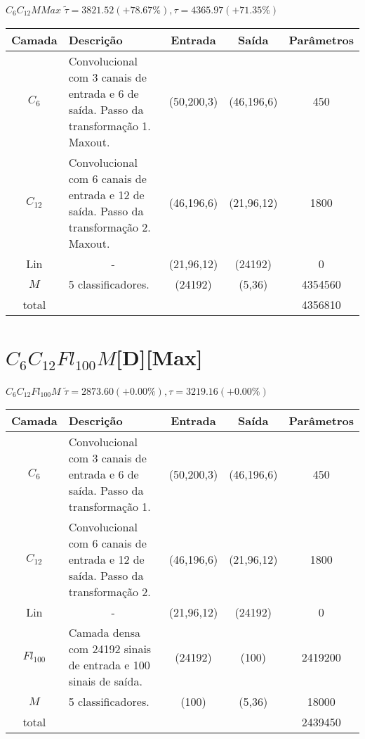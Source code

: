\begin{tiny}
\begin{table}[H]
	$C_6C_{12}MMax$ $\tilde{\tau}=3821.52 (+78.67\%), \tau=4365.97 (+71.35\%)$\newline
	\begin{tabularx}{\linewidth}{ |c|X|c|c|c| }
		\hline
		Camada & Descrição & Entrada & Saída & Parâmetros \\ \hline
		$C_{6}$ & Convolucional com 3 canais de entrada e 6 de saída. Passo da transformação 1. Maxout. & (50,200,3) & (46,196,6) & 450 \\ \hline
		$C_{12}$ & Convolucional com 6 canais de entrada e 12 de saída. Passo da transformação 2. Maxout. & (46,196,6) & (21,96,12) & 1800 \\ \hline
		Lin & \multicolumn{1}{c|}{-} & (21,96,12) & (24192) & 0 \\ \hline
		$M$ & 5 classificadores. & (24192) & (5,36) & 4354560 \\ \hline
		total &  &  &  & 4356810 \\ \hline
	\end{tabularx}
\end{table}

\section*{$C_6C_{12}Fl_{100}M$[D][Max]}

\begin{table}[H]
	$C_6C_{12}Fl_{100}M$ $\tilde{\tau}=2873.60 (+0.00\%), \tau=3219.16 (+0.00\%)$\newline
	\begin{tabularx}{\linewidth}{ |c|X|c|c|c| }
		\hline
		Camada & Descrição & Entrada & Saída & Parâmetros \\ \hline
		$C_{6}$ & Convolucional com 3 canais de entrada e 6 de saída. Passo da transformação 1. & (50,200,3) & (46,196,6) & 450 \\ \hline
		$C_{12}$ & Convolucional com 6 canais de entrada e 12 de saída. Passo da transformação 2. & (46,196,6) & (21,96,12) & 1800 \\ \hline
		Lin & \multicolumn{1}{c|}{-} & (21,96,12) & (24192) & 0 \\ \hline
		$Fl_{100}$ & Camada densa com 24192 sinais de entrada e 100 sinais de saída. & (24192) & (100) & 2419200 \\ \hline
		$M$ & 5 classificadores. & (100) & (5,36) & 18000 \\ \hline
		total &  &  &  & 2439450 \\ \hline
	\end{tabularx}
\end{table}


\end{tiny}
